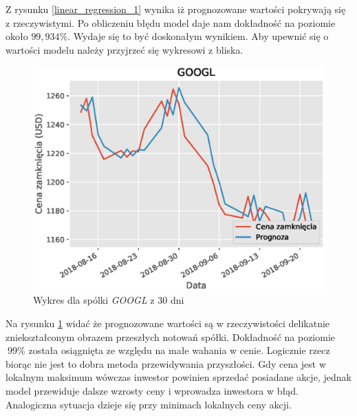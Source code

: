 \documentclass[a4paper, twoside, 11pt, openright]{article}
\begin{document}
Z rysunku \ref{linear_regression_1} wynika iż prognozowane wartości pokrywają się z rzeczywistymi. Po obliczeniu błędu model daje nam dokładność na poziomie około  $99,934\%$. Wydaje się to być doskonałym wynikiem. Aby upewnić się o wartości modelu należy przyjrzeć się wykresowi z bliska.

\begin{figure}[H]
\centering \includegraphics[scale=0.9]{img/linear_regression/l_r_1_day_last_30}
\caption{Wykres dla spólki \textit{GOOGL} z 30 dni}
\label{l_r_1_day_last_30}
\end{figure}

Na rysunku \ref{l_r_1_day_last_30} widać że prognozowane wartości są w rzeczywistości delikatnie zniekształconym obrazem przeszłych notowań spółki. Dokładność na poziomie $~99\%$ została osiągnięta ze względu na małe wahania w cenie. Logicznie rzecz biorąc nie jest to dobra metoda przewidywania przyszłości. Gdy cena jest w lokalnym maksimum wówczas inwestor powinien sprzedać posiadane akcje, jednak model przewiduje dalsze wzrosty ceny i wprowadza inwestora w błąd. Analogiczna sytuacja dzieje się przy minimach lokalnych ceny akcji.

\bigskip
\end{document}
